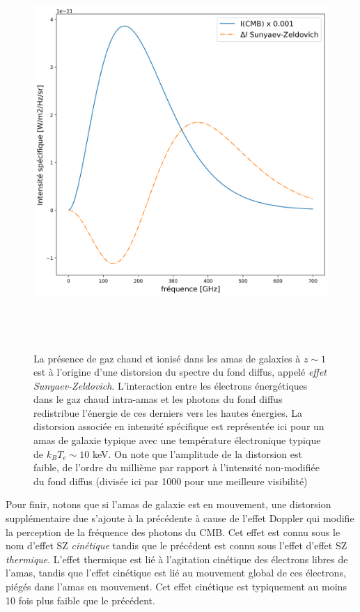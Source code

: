 \begin{figure}[htbp]
	\centering
		\includegraphics[height=15cm]{figs/SZ.png}
		\caption[L'effet SZ]{La présence de gaz chaud et ionisé dans les amas de galaxies à $z\sim 1$ est à l'origine d'une distorsion du spectre du fond diffus, appelé \textit{effet Sunyaev-Zeldovich}. L'interaction entre les électrons énergétiques dans le gaz chaud intra-amas et les photons du fond diffus redistribue l'énergie de ces derniers vers les hautes énergies. La distorsion associée en intensité spécifique est représentée ici pour un amas de galaxie typique avec une température électronique typique de $k_B T_e \sim 10$ keV. On note que l'amplitude de la distorsion est faible, de l'ordre du millième par rapport à l'intensité non-modifiée du fond diffus (divisée ici par 1000 pour une meilleure visibilité) }
	\label{f:SZ}
\end{figure}
Pour finir, notons que si l'amas de galaxie est en mouvement, une distorsion supplémentaire due s'ajoute à la précédente à cause de l'effet Doppler qui modifie la perception de la fréquence des photons du CMB. Cet effet est connu sous le nom d'effet SZ \textit{cinétique} tandis que le précédent est connu sous l'effet d'effet SZ \textit{thermique}. L'effet thermique est lié à l'agitation cinétique des électrons libres de l'amas, tandis que l'effet cinétique est lié au mouvement global de ces électrons, piégés dans l'amas en mouvement. Cet effet cinétique est typiquement au moins 10 fois plus faible que le précédent.


